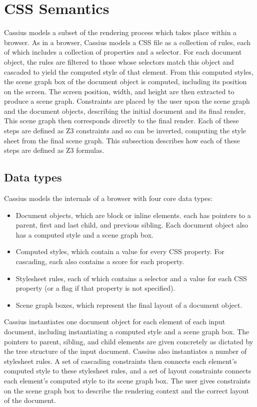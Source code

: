 \documentclass[10pt]{sigplanconf}
\newcommand{\name}{Cassius\xspace}
\begin{document}
\section{CSS Semantics}

\name models a subset of the rendering process
  which takes place within a browser.
As in a browser, \name models a CSS file as a collection of rules,
  each of which includes a collection of properties and a selector.
For each document object,
  the rules are filtered to those whose selectors match this object
  and cascaded to yield the computed style of that element.
From this computed styles,
  the scene graph box of the document object is computed,
  including its position on the screen.
The screen position, width, and height are then extracted
  to produce a scene graph.
Constraints are placed by the user
  upon the scene graph and the document objects,
  describing the initial document and its final render,
This scene graph then corresponds directly to the final render.
Each of these steps are defined as Z3 constraints
  and so can be inverted,
  computing the style sheet from the final scene graph.
This subsection describes how each of these steps
  are defined as Z3 formulas.

\subsection{Data types}
\name models the internals of a browser
  with four core data types:
\begin{itemize}
\item Document objects, which are block or inline elements.
  each has pointers to a parent, first and last child, and previous sibling.
  Each document object also has a computed style and a scene graph box.
\item Computed styles, which contain a value for every CSS property.
  For cascading, each also contains a score for each property.
\item Stylesheet rules, each of which contains a selector
  and a value for each CSS property (or a flag if that property is not specified).
\item Scene graph boxes, which represent the final layout of a document object.
\end{itemize}
\name instantiates one document object
  for each element of each input document,
  including instantiating a computed style and a scene graph box.
The pointers to parent, sibling, and child elements are given concretely
  as dictated by the tree structure of the input document.
\name also instantiates a number of stylesheet rules.
A set of cascading constraints then
  connects each element's computed style to these stylesheet rules,
  and a set of layout constraints
  connects each element's computed style to its scene graph box.
The user gives constraints on the scene graph box
  to describe the rendering context and
  the correct layout of the document.
\end{document}
